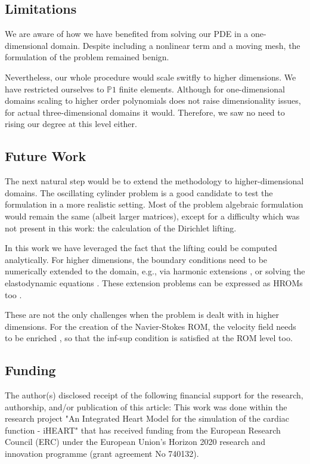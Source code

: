 \documentclass[thesis.tex]{subfiles}
\begin{document}
\subsection{Limitations}
We are aware of how we have benefited from solving our PDE in a one-dimensional domain.
Despite including a nonlinear term and a moving mesh,
the formulation of the problem remained benign. 

Nevertheless, our whole procedure would scale switfly to higher dimensions.
We have restricted ourselves to $\mathbb{P}1$ finite elements.
Although for one-dimensional domains scaling to higher order polynomials does not
raise dimensionality issues, for actual three-dimensional domains it would.
Therefore, we saw no need to rising our degree at this level either.

\subsection{Future Work}
The next natural step would be to extend the methodology to higher-dimensional domains.
The oscillating cylinder problem is a good candidate 
to test the formulation in a more realistic setting.
Most of the problem algebraic formulation would remain the same (albeit larger matrices),
except for a difficulty which was not present in this work: 
the calculation of the Dirichlet lifting. 

In this work we have leveraged the fact that the lifting could be computed analytically.
For higher dimensions, the boundary conditions need to be numerically extended to the domain, 
e.g., via harmonic extensions
\cite{formaggiaALE},
or solving the elastodynamic equations
\cite{1995_farhat_elasticEquations}.
These extension problems can be expressed as HROMs too \cite{Santo_Manzoni_2019}.

These are not the only challenges when the problem is dealt with in higher dimensions.
For the creation of the Navier-Stokes ROM, the velocity field needs to be enriched
\cite{supremizers},
so that the inf-sup condition is satisfied at the ROM level too.

\subsection*{Funding}
The author(s) disclosed receipt of the following financial support for the research, 
authorship, and/or publication of this article: 
This work was done
within the research project 
"An Integrated Heart Model for the simulation of the cardiac function - iHEART" 
that has received funding from the European Research Council (ERC) 
under the European Union’s Horizon 2020 research and innovation programme 
(grant agreement No 740132).
\end{document}
